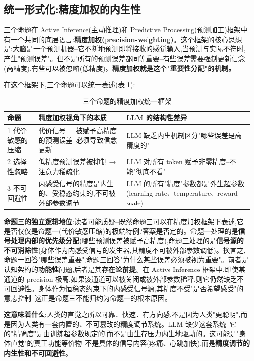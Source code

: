\documentclass[11pt,a4paper]{article}
\begin{document}
\subsection{统一形式化:精度加权的内生性}

三个命题在 Active Inference(主动推理)和 Predictive Processing(预测加工)框架中有一个共同的底层语言:\textbf{精度加权(precision-weighting)}\cite{friston2010free,parr2022active}。这个框架的核心思想是:大脑是一个预测机器--它不断地预测即将接收的感觉输入,当预测与实际不符时,产生"预测误差"。但不是所有的预测误差都同等重要--有些误差需要强制更新信念(高精度),有些可以被忽略(低精度)。\textbf{精度加权就是这个"重要性分配"的机制。}

在这个框架下,三个命题可以统一表述(表 \ref{tab:precision}):

\begin{table}[htbp]
  \centering
  \caption{三个命题的精度加权统一框架}
  \label{tab:precision}
  \begin{tabular}{p{3cm}p{5cm}p{5cm}}
    \toprule
    \textbf{命题} & \textbf{精度加权视角下的本质} & \textbf{LLM 的结构性差异} \\
    \midrule
    1 代价敏感的压缩 & 代价信号 = 被赋予高精度的预测误差--必须导致信念更新 & LLM 缺乏内生机制区分"哪些误差是高精度的" \\
    \hline
    2 选择性忽略 & 低精度预测误差被抑制 → 注意力稀疏化 & LLM 对所有 token 赋予非零精度--不能"彻底不看" \\
    \hline
    3 不可回避性 & 内感受信号的精度是内生的、受稳态约束的,不可被外部参数调节 & LLM 的所有"精度"参数都是外生超参数(learning rate、temperature、reward scale) \\
    \bottomrule
  \end{tabular}
\end{table}

\textbf{命题三的独立逻辑地位}:读者可能质疑--既然命题三可以在精度加权框架下表述,它是否仅仅是命题一(代价敏感压缩)的极端特例?答案是否定的。命题一处理的是\textbf{信号处理内部的优先级分配}(哪些预测误差被赋予高精度),命题三处理的是\textbf{信号源的不可消除性}(身体作为内感受信号的发生器,其精度不可被外部参数调低)。换言之,命题一回答"哪些误差重要",命题三回答"为什么某些误差必须被视为重要"。前者是认知架构的\textbf{功能性}问题,后者是其\textbf{存在论前提}。在 Active Inference 框架中,即使某通道的 precision 极高,如果该通道可以被关闭或被外部参数稀释,则它仍然缺乏不可回避性。身体作为恒稳态约束下的内感受信号源,其精度不受"是否希望感受"的意志控制--这正是命题三不能归约为命题一的根本原因。

\textbf{这意味着什么}:人类的直觉之所以可靠、快速、有方向感,不是因为人类"更聪明",而是因为人类有一套内置的、不可篡改的精度调节系统。LLM 缺少这套系统--它的"精确度"是由训练超参数规定的,而不是由生存压力内生地驱动的。这可能是"身体直觉"的真正功能等价物--不是具体的信号内容(疼痛、心跳加快),而是\textbf{精度调节的内生性和不可回避性}。
\end{document}
